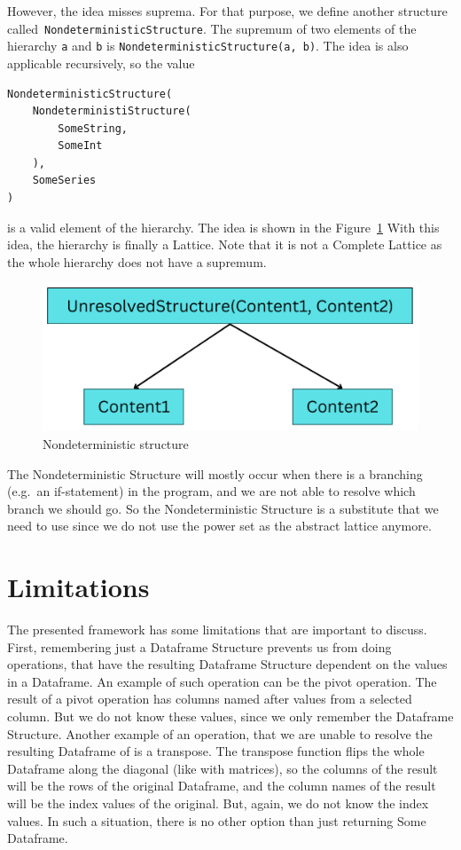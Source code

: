 However, the idea misses suprema.
For that purpose, we define another structure called~\verb|NondeterministicStructure|.
The supremum of two elements of the hierarchy \verb|a| and \verb|b| is \verb|NondeterministicStructure(a, b)|.
The idea is also applicable recursively, so the value \\
\begin{verbatim}
NondeterministicStructure(
    NondeterministiStructure(
        SomeString,
        SomeInt
    ),
    SomeSeries
)
\end{verbatim}
is a valid element of the hierarchy.
The idea is shown in the Figure~\ref{fig:nondeterministic_structure}
With this idea, the hierarchy is finally a Lattice.
Note that it is not a Complete Lattice as the whole hierarchy does not have a supremum.

\begin{figure}[H]
    \caption{Nondeterministic structure}
    \label{fig:nondeterministic_structure}
    \centering
    \includegraphics[scale=0.5]{img/unresolved_structure}
\end{figure}

The Nondeterministic Structure will mostly occur when there is a branching (e.g.~an if-statement) in the program, and we
are not able to resolve which branch we should go.
So the Nondeterministic Structure is a substitute that we need to use since we do not use the power set as the abstract
lattice anymore.


\section{Limitations}

The presented framework has some limitations that are important to discuss.
First, remembering just a Dataframe Structure prevents us from doing operations, that have the resulting Dataframe
Structure dependent on the values in a Dataframe.
An example of such operation can be the pivot operation.
The result of a pivot operation has columns named after values from a selected column.
But we do not know these values, since we only remember the Dataframe Structure.
Another example of an operation, that we are unable to resolve the resulting Dataframe of is a transpose.
The transpose function flips the whole Dataframe along the diagonal (like with matrices), so the columns of the result
will be the rows of the original Dataframe, and the column names of the result will be the index values of the original.
But, again, we do not know the index values.
In such a situation, there is no other option than just returning Some Dataframe.

